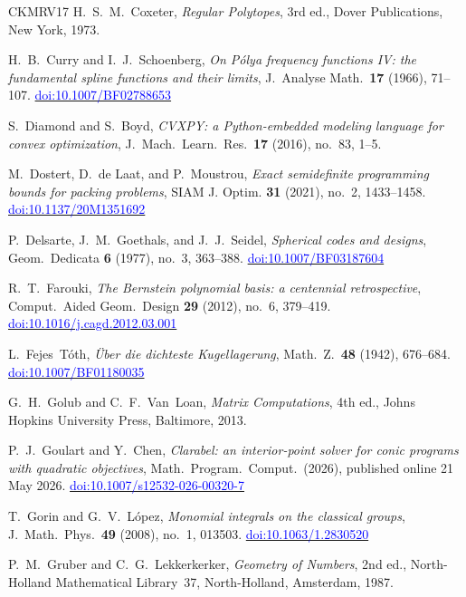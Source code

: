 \documentclass[11pt,reqno]{amsart}
\newcommand{\bluelink}[2]{\href{#1}{\textcolor{blue}{#2}}}
\renewcommand{\_}{\origunderscore\allowbreak}
\numberwithin{equation}{section}
\theoremstyle{plain}
\theoremstyle{definition}
\theoremstyle{remark}
\begin{document}
\begin{thebibliography}{CKMRV17}
H.~S.~M.~Coxeter,
\textit{Regular Polytopes}, 3rd ed.,
Dover Publications, New York, 1973.

H.~B.~Curry and I.~J.~Schoenberg,
\textit{On {P}\'olya frequency functions {IV}: the fundamental spline functions
and their limits},
J.\ Analyse Math.\ \textbf{17} (1966), 71--107.
\bluelink{https://doi.org/10.1007/BF02788653}{doi:10.1007/BF02788653}

S.~Diamond and S.~Boyd,
\textit{CVXPY: a Python-embedded modeling language for convex optimization},
J.\ Mach.\ Learn.\ Res.\ \textbf{17} (2016), no.~83, 1--5.

M.~Dostert, D.~de Laat, and P.~Moustrou,
\textit{Exact semidefinite programming bounds for packing problems},
SIAM J. Optim. \textbf{31} (2021), no.~2, 1433--1458.
\bluelink{https://doi.org/10.1137/20M1351692}{doi:10.1137/20M1351692}

P.~Delsarte, J.~M.~Goethals, and J.~J.~Seidel,
\textit{Spherical codes and designs},
Geom.\ Dedicata \textbf{6} (1977), no.~3, 363--388.
\bluelink{https://doi.org/10.1007/BF03187604}{doi:10.1007/BF03187604}

R.~T.~Farouki,
\textit{The {B}ernstein polynomial basis: a centennial retrospective},
Comput.\ Aided Geom.\ Design \textbf{29} (2012), no.~6, 379--419.
\bluelink{https://doi.org/10.1016/j.cagd.2012.03.001}{doi:10.1016/j.cagd.2012.03.001}

L.~Fejes~T\'oth,
\textit{\"Uber die dichteste Kugellagerung},
Math.\ Z.\ \textbf{48} (1942), 676--684.
\bluelink{https://doi.org/10.1007/BF01180035}{doi:10.1007/BF01180035}

G.~H.~Golub and C.~F.~Van~Loan,
\textit{Matrix Computations}, 4th ed.,
Johns Hopkins University Press, Baltimore, 2013.

P.~J.~Goulart and Y.~Chen,
\textit{Clarabel: an interior-point solver for conic programs with quadratic objectives},
Math.\ Program.\ Comput.\ (2026), published online 21 May 2026.
\bluelink{https://doi.org/10.1007/s12532-026-00320-7}{doi:10.1007/s12532-026-00320-7}

T.~Gorin and G.~V.~L\'opez,
\textit{Monomial integrals on the classical groups},
J.\ Math.\ Phys.\ \textbf{49} (2008), no.~1, 013503.
\bluelink{https://doi.org/10.1063/1.2830520}{doi:10.1063/1.2830520}

P.~M.~Gruber and C.~G.~Lekkerkerker,
\textit{Geometry of Numbers}, 2nd ed.,
North-Holland Mathematical Library~37, North-Holland, Amsterdam, 1987.


\end{thebibliography}
\end{document}
